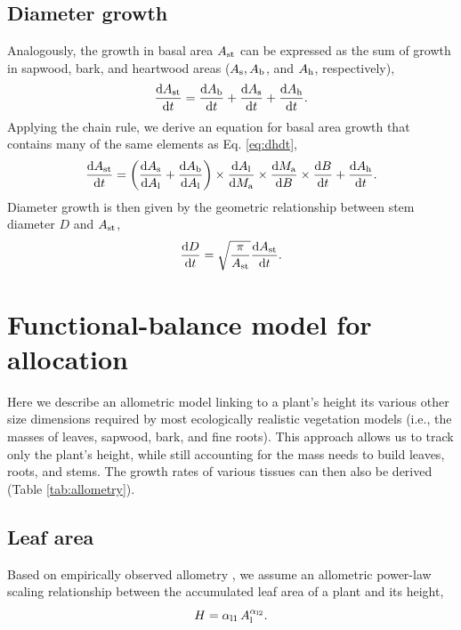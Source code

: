 \documentclass[10pt,twoside]{article}
\begin{document}
\subsection{Diameter growth}

Analogously, the growth in basal area $A_{\rm st}$ can be
expressed as the sum of growth in sapwood, bark, and heartwood areas
($A_{\rm s}, A_{\rm b}$, and $A_{\rm h}$, respectively),
$$\frac{{\rm d}A_{\rm st}}{{\rm d}t} = \frac{{\rm d}A_{\rm b}}{{\rm d}t} + \frac{{\rm d}A_{\rm s}}{{\rm d}t} + \frac{{\rm d}A_{\rm h}}{{\rm d}t}.$$
Applying the chain rule, we derive an equation for basal area growth that contains many of the same
elements as Eq. \ref{eq:dhdt},
\begin{equation}\label{eq:dast}
\frac{{\rm d}A_{\rm st}}{{\rm d}t} = \left(\frac{{\rm d}A_{\rm s}}{{\rm d}A_{\rm l}} + \frac{{\rm d}A_{\rm b}}{{\rm d}A_{\rm l}}\right) \times
\frac{{\rm d}A_{\rm l}}{{\rm d}M_{\rm a}} \times \frac{{\rm d}M_{\rm a}}{{\rm d}B} \times \frac{{\rm d}B}{{\rm d}t} + \frac{{\rm d}A_{\rm h}}{{\rm d}t} .
\end{equation}
Diameter growth is then given by the geometric relationship between stem
diameter $D$ and $A_{\rm st}$,
\begin{equation} \label{eq:dDdt}
\frac{{\rm d}D}{{\rm d}t} = \sqrt{\frac{\pi}{A_{\rm st}}} \frac{{\rm d}A_{\rm st}}{{\rm d}t}.
\end{equation}

\section{Functional-balance model for
allocation}\label{a-functional-balance-model-for-allocation}

Here we describe an allometric model linking to a plant's height its various other size dimensions
required by most ecologically realistic vegetation models
(i.e., the masses of leaves, sapwood, bark, and fine
roots). This approach allows us to track only the
plant's height, while still accounting for the mass needs to build
leaves, roots, and stems. The growth rates of various tissues can then
also be derived (Table \ref{tab:allometry}).

\subsection{Leaf area}\label{leaf-area}

Based on empirically observed allometry \citep{Falster-2011}, we assume an allometric power-law
scaling relationship between the accumulated leaf area of a plant and
its height,
\begin{equation}\label{eq:ha}
H = \alpha_{{\rm l1}} \, A_{\rm l}^{\alpha_{{\rm l2}}}.
\end{equation}
\end{document}
